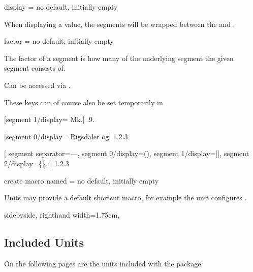 \documentclass{article}
\begin{document}
\begin{docKey}
	[segment 0]
	{display}
	{=}
	{no default, initially empty}

	When displaying a value, the segments will be wrapped between the  and .
\end{docKey}

\begin{docKey}
	[segment 0]
	{factor}
	{=}
	{no default, initially empty}
	
	The factor of a segment is how many of the underlying segment the given segment consists of.
	
	Can be accessed via .
\end{docKey}

These keys can of course also be set temporarily in 

\begin{dispExample}
	[segment 1/display={}{ Mk.}]
	{.9.}

	[segment 0/display={}{ Rigsdaler og}]
	{1.2.3}

[
		segment separator={---},
		segment 0/display={(}{)},
		segment 1/display={[}{]},
		segment 2/display={\{}{\}},
	]
	{1.2.3}
\end{dispExample}

\begin{docKey}
	{create macro named}
	{=}
	{no default, initially empty}
	
	Units may provide a default shortcut macro, for example the  unit configures .

\begin{dispExample*}{
	sidebyside,
	righthand width=1.75cm,
}
\end{dispExample*}
\end{docKey}

\clearpage
\subsection{Included Units} %

\label{units:included}
On the following pages are the units included with the package.

\clearpage
{}

\clearpage
{}

\printindex  %
\end{document}
